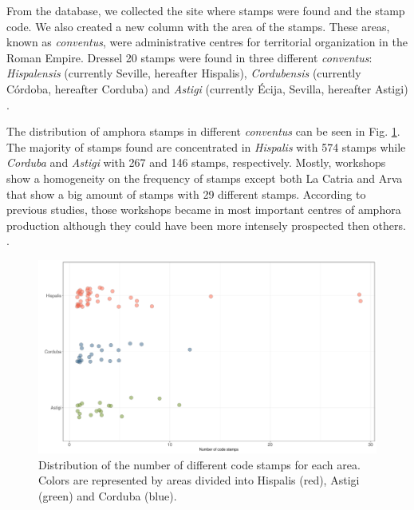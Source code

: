\documentclass[review]{elsarticle}
\begin{document}

From the database, we collected the site where stamps were found and the stamp code. We also created a new column with the area of the stamps. These areas, known as \textit{conventus}, were administrative centres for territorial organization in the Roman Empire. Dressel 20 stamps were found in three different \textit{conventus}: \textit{Hispalensis} (currently Seville, hereafter Hispalis), \textit{Cordubensis} (currently C\'ordoba, hereafter Corduba) and \textit{Astigi} (currently Écija, Sevilla, hereafter Astigi) \citep{rodriguez_economioleicola_1977,chic_datos_2001,berni_millet_epigrafianforica_2008} .

The distribution of amphora stamps in different \textit{conventus} can be seen in Fig. \ref{frequency}. The majority of stamps found are concentrated in \textit{Hispalis} with 574 stamps while \textit{Corduba} and \textit{Astigi} with 267 and 146 stamps, respectively. Mostly, workshops show a homogeneity on the frequency of stamps except both La Catria and Arva that show a big amount of stamps with 29 different stamps. According to previous studies, those workshops became in most important centres of amphora production although they could have been more intensely prospected then others. \citep{arva_1997}.
 
\begin{figure}[htp]
	\centering
\includegraphics[width=\linewidth]{figs/frequency}
\caption{Distribution of the number of different code stamps for each area. Colors are represented by areas divided into Hispalis (red), Astigi (green) and Corduba (blue).}
\label{frequency}
\end{figure} 
\end{document}

